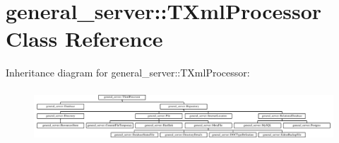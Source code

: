 \hypertarget{classgeneral__server_1_1TXmlProcessor}{\section{general\-\_\-server\-:\-:\-T\-Xml\-Processor \-Class \-Reference}
\label{classgeneral__server_1_1TXmlProcessor}
}
\-Inheritance diagram for general\-\_\-server\-:\-:\-T\-Xml\-Processor\-:\begin{figure}[H]
\begin{center}
\leavevmode
\includegraphics[height=1.985816cm]{classgeneral__server_1_1TXmlProcessor}
\end{center}
\end{figure}
